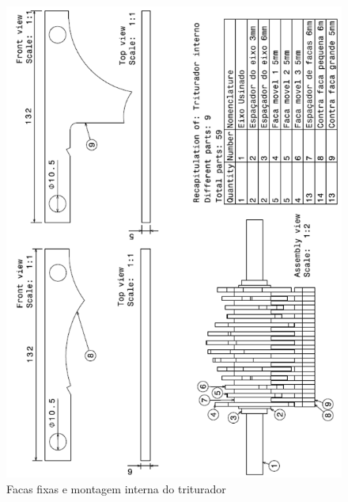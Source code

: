 \begin{anexosenv}
\begin{figure}[!ht]
	\centering
		\includegraphics[scale=0.6]{figuras/estrutura/anexos/5.png}
	\caption{Facas fixas e montagem interna do triturador}
\end{figure}


\end{anexosenv}
